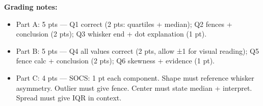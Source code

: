 \documentclass[10pt]{article}
\begin{document}
\boxguard
\begin{teachernote}[Homework]
\textbf{Grading notes:}
\begin{itemize}[itemsep=2pt]
  \item Part A: 5 pts — Q1 correct (2 pts: quartiles + median); Q2 fences + conclusion (2 pts); Q3 whisker end + dot explanation (1 pt).
  \item Part B: 5 pts — Q4 all values correct (2 pts, allow ±1 for visual reading); Q5 fence calc + conclusion (2 pts); Q6 skewness + evidence (1 pt).
  \item Part C: 4 pts — SOCS: 1 pt each component. Shape must reference whisker asymmetry. Outlier must give fence. Center must state median + interpret. Spread must give IQR in context.
\end{itemize}
\end{teachernote}
\end{document}
